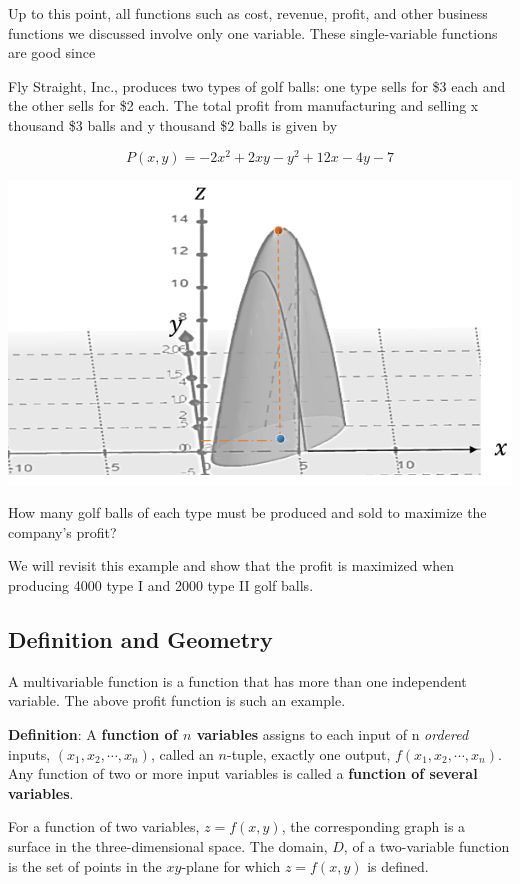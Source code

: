 \documentclass[
]{book}
\begin{document}
Up to this point, all functions such as cost, revenue, profit, and other business functions we discussed involve only one variable. These single-variable functions are good since

Fly Straight, Inc., produces two types of golf balls: one type sells for \$3 each and the other sells for \$2 each. The total profit from manufacturing and selling x thousand \$3 balls and y thousand \$2 balls is given by

\[
P(x,y) =  -2x^2 +2xy - y^2 + 12x - 4y - 7
\]

\begin{center}\includegraphics[width=0.55\linewidth]{img13/w13-profitSurface} \end{center}

How many golf balls of each type must be produced and sold to maximize the company's profit?

We will revisit this example and show that the profit is maximized when producing 4000 type I and 2000 type II golf balls.

\hypertarget{definition-and-geometry}{%
\subsection{Definition and Geometry}\label{definition-and-geometry}}

A multivariable function is a function that has more than one independent variable. The above profit function is such an example.

\textbf{Definition}: A \textbf{function of \(n\) variables} assigns to each input of n \emph{ordered} inputs, \((x_1, x_2, \cdots, x_n)\), called an \(n\)-tuple, exactly one output, \(f(x_1, x_2, \cdots, x_n)\). Any function of two or more input variables is called a \textbf{function of several variables}.

For a function of two variables, \(z = f(x, y)\), the corresponding graph is a surface in the three-dimensional space. The domain, \(D\), of a two-variable function is the set of points in the \(xy\)-plane for which \(z = f(x,y)\) is defined.
\end{document}
